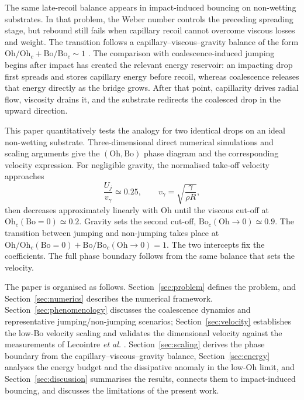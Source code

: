 \documentclass[
reprint,
amsmath,amssymb,
superscriptaddress,
onecolumn,
aps,
prfluids,
longbibliography,
floatfix
]{revtex4-2}
\newcommand{\Oh}{\mathrm{Oh}}
\newcommand{\Bo}{\mathrm{Bo}}
\newcommand{\vgamma}{v_\gamma}
\begin{document}
The same late-recoil balance appears in impact-induced bouncing on non-wetting substrates. In that problem, the Weber number controls the preceding spreading stage, but rebound still fails when capillary recoil cannot overcome viscous losses and weight. The transition follows a capillary--viscous--gravity balance of the form $\Oh/\Oh_c+\Bo/\Bo_c\sim1$ \cite{sanjay2023bouncing}. The comparison with coalescence-induced jumping begins after impact has created the relevant energy reservoir: an impacting drop first spreads and stores capillary energy before recoil, whereas coalescence releases that energy directly as the bridge grows. After that point, capillarity drives radial flow, viscosity drains it, and the substrate redirects the coalesced drop in the upward direction.

This paper quantitatively tests the analogy for two identical drops on an ideal non-wetting substrate. Three-dimensional direct numerical simulations and scaling arguments give the $(\Oh,\Bo)$ phase diagram and the corresponding velocity expression. For negligible gravity, the normalised take-off velocity approaches
\begin{equation}
    \frac{U_j}{\vgamma} \simeq 0.25, \qquad \vgamma=\sqrt{\frac{\gamma}{\rho R}},
    \label{eq:plateau_intro}
\end{equation}
then decreases approximately linearly with $\Oh$ until the viscous cut-off at $\Oh_c(\Bo=0)\simeq0.2$. Gravity sets the second cut-off, $\Bo_c(\Oh\to 0)\simeq0.9$. The transition between jumping and non-jumping takes place at $\Oh/\Oh_c(\Bo=0)+\Bo/\Bo_c(\Oh\to 0)=1$. The two intercepts fix the coefficients. The full phase boundary follows from the same balance that sets the velocity.

The paper is organised as follows. Section~\ref{sec:problem} defines the problem, and Section~\ref{sec:numerics} describes the numerical framework. Section~\ref{sec:phenomenology} discusses the coalescence dynamics and representative jumping/non-jumping scenarios; Section~\ref{sec:velocity} establishes the low-$\Bo$ velocity scaling and validates the dimensional velocity against the measurements of Lecointre \textit{et al.} \cite{lecointre2019ballistics}. Section~\ref{sec:scaling} derives the phase boundary from the capillary--viscous--gravity balance, Section~\ref{sec:energy} analyses the energy budget and the dissipative anomaly in the low-$\Oh$ limit, and Section~\ref{sec:discussion} summarises the results, connects them to impact-induced bouncing, and discusses the limitations of the present work.
\end{document}

